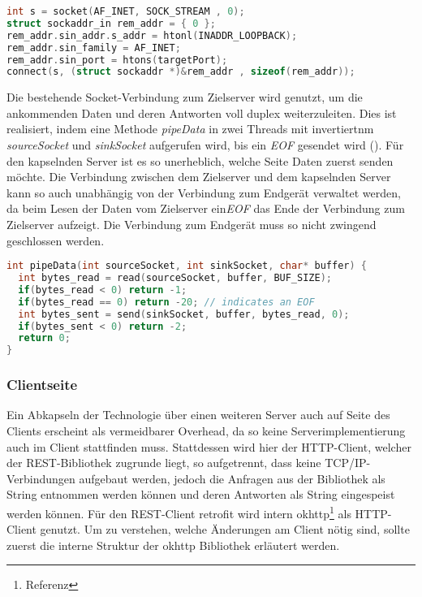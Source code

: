         \begin{lstlisting}[frame=bt, label={lst:socket:create}, language=C, caption=Instanziierung eines Sockets (Servercode in C)]
int s = socket(AF_INET, SOCK_STREAM , 0);
struct sockaddr_in rem_addr = { 0 };
rem_addr.sin_addr.s_addr = htonl(INADDR_LOOPBACK);
rem_addr.sin_family = AF_INET;
rem_addr.sin_port = htons(targetPort);
connect(s, (struct sockaddr *)&rem_addr , sizeof(rem_addr));
        \end{lstlisting}        
        
        Die bestehende Socket-Verbindung zum Zielserver wird genutzt, um die ankommenden Daten und deren Antworten voll duplex weiterzuleiten. Dies ist realisiert, indem eine Methode {\it pipeData} in zwei Threads mit invertiertnm {\it sourceSocket} und {\it sinkSocket} aufgerufen wird, bis ein {\it EOF} gesendet wird (). Für den kapselnden Server ist es so unerheblich, welche Seite Daten zuerst senden möchte. Die Verbindung zwischen dem Zielserver und dem kapselnden Server kann so auch unabhängig von der Verbindung zum Endgerät verwaltet werden, da beim Lesen der Daten vom Zielserver ein{\it EOF} das Ende der Verbindung zum Zielserver aufzeigt. Die Verbindung zum Endgerät muss so nicht zwingend geschlossen werden.
        
        \begin{lstlisting}[frame=bt, label={lst:socket:data}, language=C, caption=Datenweiterleitung durch Sockets (Servercode in C)] 
int pipeData(int sourceSocket, int sinkSocket, char* buffer) {
  int bytes_read = read(sourceSocket, buffer, BUF_SIZE);
  if(bytes_read < 0) return -1;
  if(bytes_read == 0) return -20; // indicates an EOF
  int bytes_sent = send(sinkSocket, buffer, bytes_read, 0);
  if(bytes_sent < 0) return -2;
  return 0;
}
        \end{lstlisting}        
        
        \subsubsection{Clientseite}
        Ein Abkapseln der Technologie über einen weiteren Server auch auf Seite des Clients erscheint als vermeidbarer Overhead, da so keine Serverimplementierung auch im Client stattfinden muss. Stattdessen wird hier der HTTP-Client, welcher der REST-Bibliothek zugrunde liegt, so aufgetrennt, dass keine TCP/IP-Verbindungen aufgebaut werden, jedoch die Anfragen aus der Bibliothek als String entnommen werden können und  deren Antworten als String eingespeist werden können. Für den REST-Client retrofit wird intern okhttp\footnote{Referenz} als HTTP-Client genutzt. Um zu verstehen, welche Änderungen am Client nötig sind, sollte zuerst die interne Struktur der okhttp Bibliothek erläutert werden.
        
